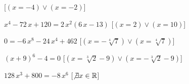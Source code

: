 \begin{esercizio}
\begin{enumeratea}
\hfill [$(x=-4)\vee (x=-2)$]
\item ${x}^{4}-72\,x+120=2\,{x}^{2} \left( 6\,x-13 \right) $ 
\hfill [$(x=2)\vee (x=10)$]
\item $0=-6\,{x}^{8}-24\,{x}^{4}+462$ 
\hfill [$(x=-\sqrt [4]{7})\vee (x=\sqrt [4]{7})$]
\item $ \left( x+9 \right) ^{6}-4=0$ 
\hfill [$(x=\sqrt [3]{2}-9)\vee (x=-\sqrt [3]{2}-9)$]
\item $128\,{x}^{3}+800=-8\,{x}^{6}$ 
\hfill [$\not\exists x \in \mathbb{R}$]
\end{enumeratea}
\end{esercizio}

